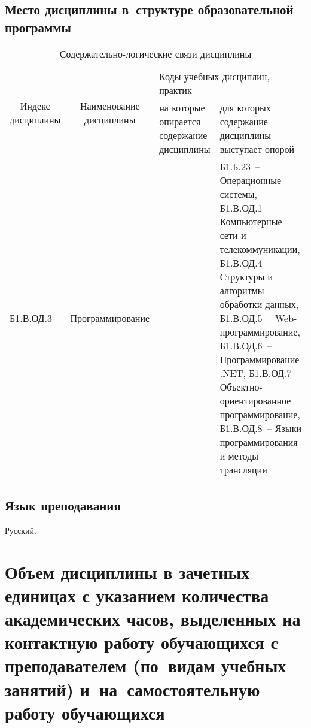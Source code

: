 \documentclass[a4paper,12pt]{article}
\begin{document}
\subsection{Место дисциплины в~структуре образовательной программы}

  \begin{table}[H]
  \setlength\arraycolsep{3pt}
  \caption{Содержательно-логические связи дисциплины}
  \begin{tabular}{|l|p{18ex}|*{2}{p{23ex}|}}
  \hline
  \multicolumn{1}{|c|}{\multirow{2}{13ex}{\centering Индекс \linebreak дисциплины}} &
  \multicolumn{1}{c|}{\multirow{2}{18ex}{\centering Наименование \linebreak дисциплины}} & 
  \multicolumn{2}{p{46ex}|}{\centering Коды учебных дисциплин, практик} \\
  \cline{3-4}
   & & 
  \centering на которые опирается содержание дисциплины & 
  \centering\arraybackslash для которых содержание дисциплины выступает опорой
  \\ \hline
  Б1.В.ОД.3 & Программирование 
  & 
  \raggedright
  
  --- 
  & 
  \raggedright\arraybackslash
  
  Б1.Б.23~-- Операционные системы,
  Б1.В.ОД.1~-- Компьютерные сети и телекоммуникации,
  Б1.В.ОД.4~-- Структуры и алгоритмы обработки данных,
  Б1.В.ОД.5~-- Web-программирование,
  Б1.В.ОД.6~-- Программирование .NET,
  Б1.В.ОД.7~-- Объектно-ориентированное программирование,
  Б1.В.ОД.8~-- Языки программирования и методы трансляции 
  \\ \hline
  \end{tabular}
  \end{table}


\subsection{Язык преподавания} 
  Русский.
  



\newpage

\section{Объем дисциплины в зачетных единицах с указанием количества академических часов, выделенных на контактную работу обучающихся с преподавателем (по~видам учебных занятий) и~на~самостоятельную работу обучающихся}
\end{document}
